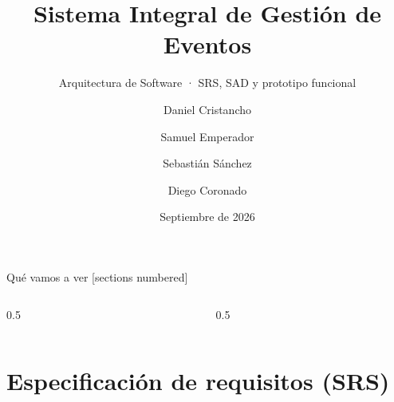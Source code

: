 \documentclass[aspectratio=169,10pt,xcolor={table}]{beamer}
\title{Sistema Integral de Gestión de Eventos}
\subtitle{Arquitectura de Software · SRS, SAD y prototipo funcional}
\author{Daniel Cristancho \and Samuel Emperador \and Sebastián Sánchez \and Diego Coronado}
\institute{Pontificia Universidad Javeriana · HEXACORE}
\date{Septiembre de 2026}
\begin{document}
\maketitle

\begin{frame}{Qué vamos a ver}
  [sections numbered]
  \footnotesize
  \begin{columns}[T]
    \begin{column}{0.5\textwidth}
      \tableofcontents[sections={1-5}]
    \end{column}
    \begin{column}{0.5\textwidth}
      \tableofcontents[sections={6-10}]
    \end{column}
  \end{columns}
\end{frame}

\section{Especificación de requisitos (SRS)}
\end{document}
